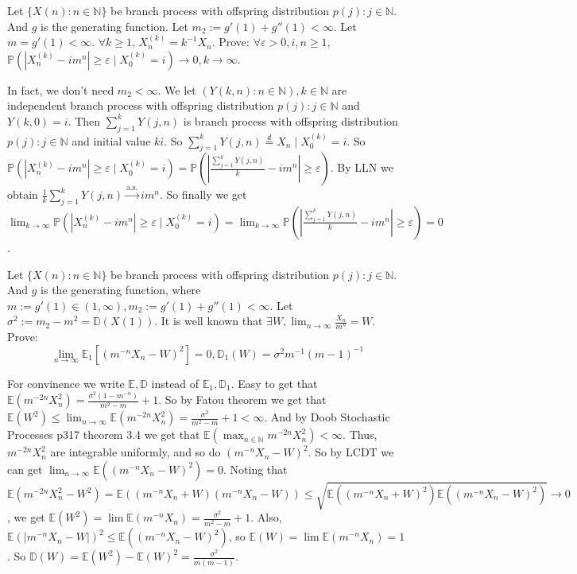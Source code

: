 \documentclass{ctexart}
\begin{document}
\begin{problem}\label{pro:3}
  Let \(\{X(n): n \in \mathbb{N}\}\) be branch process with offspring distribution \(p(j): j \in \mathbb{N}\).
  And \(g\) is the generating function. Let \(m_2:=g'(1) + g''(1) < \infty\).
  Let \(m=g'(1)<\infty\).
  \(\forall k \geq 1\), \(X_n^{(k)}=k^{-1}X_n\).
  Prove: \(\forall \varepsilon >0, i,n \geq 1\), \(\mathbb{P}(|X_n^{(k)} -im^n| \geq \varepsilon \mid X_0^{(k)}=i) \to 0, k \to \infty\).
\end{problem}
\begin{solution}
  In fact, we don't need \(m_2<\infty\).
  We let \((Y(k,n):n \in \mathbb{N}),k \in \mathbb{N}\) are independent branch process with offspring distribution \(p(j):j \in \mathbb{N}\) and \(Y(k,0)=i\).
  Then \(\sum_{j=1}^{k} Y(j,n)\) is branch process with offspring distribution \(p(j):j \in \mathbb{N}\) and initial value \(ki\).
  So \(\sum_{j=1}^{k} Y(j,n) \overset{d}{=} X_n \mid X_0^{(k)}=i\).
  So \(\mathbb{P}(|X_n^{(k)}-im^n|\geq \varepsilon \mid X_0^{(k)}=i)=\mathbb{P}(|\frac{\sum_{j=1}^{k} Y(j,n)}{k}-im^n| \geq \varepsilon)\).
  By LLN we obtain \(\frac{1}{k}\sum_{j=1}^{k} Y(j,n)\overset{\text{a.s.}}{\to} im^n\).
  So finally we get \(\lim_{k \to \infty}\mathbb{P}(|X_n^{(k)}-im^n|\geq \varepsilon \mid X_0^{(k)}=i)=\lim_{k \to \infty}\mathbb{P}(|\frac{\sum_{j=1}^{k} Y(j,n)}{k}-im^n| \geq \varepsilon)=0\).
\end{solution}

\begin{problem}\label{pro:4}
  Let \(\{X(n): n \in \mathbb{N}\}\) be branch process with offspring distribution \(p(j): j \in \mathbb{N}\).
  And \(g\) is the generating function, where \(m :=g' (1) \in (1, \infty), m_2:=g'(1) + g''(1) < \infty\).
  Let \(\sigma^2:=m_2-m^2 = \mathbb{D}(X(1))\).
  It is well known that \(\exists W,\lim_{n \to \infty}\frac{X_n}{m^n} = W\).
  Prove: \[
    \lim_{n \to \infty}\mathbb{E}_1[(m^{-n}X_n -W)^2]= 0, \mathbb{D}_1(W)=\sigma^2 m^{-1}(m-1)^{-1}
  \]
\end{problem}
\begin{solution}
  For convinence we write \(\mathbb{E},\mathbb{D}\) instead of \(\mathbb{E}_1,\mathbb{D}_1\).
  Easy to get that \(\mathbb{E}(m ^{-2n} X_n^2)=\frac{\sigma^2(1-m^{-n})}{m^2-m}+1\).
  So by Fatou theorem we get that \(\mathbb{E}(W^2) \leq \lim_{n \to \infty}\mathbb{E}(m^{-2n}X_n^2)=\frac{\sigma^2}{m^2-m}+1<\infty\).
  And by Doob Stochastic Processes p317 theorem 3.4 we get that
  \(\mathbb{E}(\max_{n \in \mathbb{N}}m^{-2n}X_n^2) < \infty\).
  Thus, \(m^{-2n}X_n^2\) are integrable uniformly, and so do \((m^{-n}X_n-W)^2\).
  So by LCDT we can get \(\lim_{n \to \infty}\mathbb{E}((m^{-n}X_n-W)^2)=0\).
  Noting that
  \[
    \mathbb{E}(m^{-2n}X_n^2-W^2)=\mathbb{E}((m^{-n}X_n+W)(m^{-n}X_n-W)) \leq \sqrt{\mathbb{E}((m^{-n}X_n+W)^2) \mathbb{E}((m^{-n}X_n-W)^2)} \to 0
  \]
  ,
  we get \(\mathbb{E}(W^2)=\lim \mathbb{E}(m^{-n}X_n)=\frac{\sigma^2}{m^2-m}+1\).
  Also, \(\mathbb{E}(|m^{-n}X_n-W|)^2 \leq \mathbb{E}((m^{-n}X_n-W)^2)\),
  so \(\mathbb{E}(W)=\lim \mathbb{E}(m^{-n}X_n)=1\).
  So \(\mathbb{D}(W)=\mathbb{E}(W^2)-\mathbb{E}(W)^2=\frac{\sigma^2}{m(m-1)}\).
\end{solution}
\end{document}
